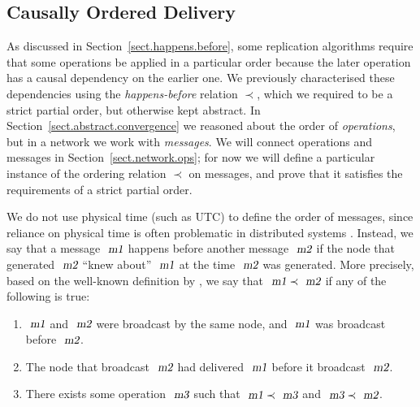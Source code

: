 \subsection{Causally Ordered Delivery}\label{sect.network.causal}

As discussed in Section~\ref{sect.happens.before}, some replication algorithms require that some operations be applied in a particular order because the later operation has a causal dependency on the earlier one.
We previously characterised these dependencies using the \emph{happens-before} relation $\prec$, which we required to be a strict partial order, but otherwise kept abstract.
In Section~\ref{sect.abstract.convergence} we reasoned about the order of \emph{operations}, but in a network we work with \emph{messages}.
We will connect operations and messages in Section~\ref{sect.network.ops}; for now we will define a particular instance of the ordering relation $\prec$ on messages, and prove that it satisfies the requirements of a strict partial order.

We do not use physical time (such as UTC) to define the order of messages, since reliance on physical time is often problematic in distributed systems \cite{Sheehy:2015jm}.
Instead, we say that a message $\isa{m1}$ happens before another message $\isa{m2}$ if the node that generated $\isa{m2}$ ``knew about'' $\isa{m1}$ at the time $\isa{m2}$ was generated.
More precisely, based on the well-known definition by \citet{Lamport:1978jq}, we say that $\isa{m1}\prec\isa{m2}$ if any of the following is true:
\begin{enumerate}
\item $\isa{m1}$ and $\isa{m2}$ were broadcast by the same node, and $\isa{m1}$ was broadcast before $\isa{m2}$.
\item The node that broadcast $\isa{m2}$ had delivered $\isa{m1}$ before it broadcast $\isa{m2}$.
\item There exists some operation $\isa{m3}$ such that $\isa{m1} \prec \isa{m3}$ and $\isa{m3} \prec \isa{m2}$.
\end{enumerate}

